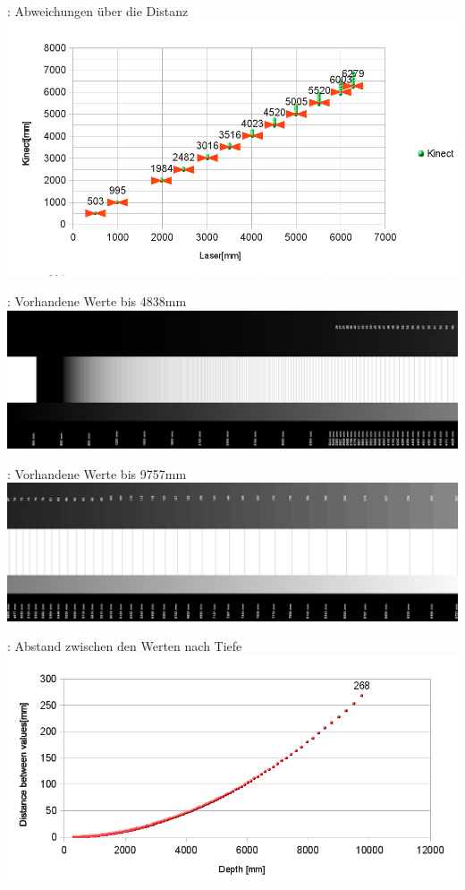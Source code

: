 \documentclass{VLKlauck}
\begin{document}
	\begin{frame}{\insertsubsection: Abweichungen über die Distanz}	
	\includegraphics[scale=0.6]{LaserDistanceKinectDistance.png}
    \end{frame}
    
    \begin{frame}{\insertsubsection: Vorhandene Werte bis 4838mm}
	\hbox{\includegraphics[scale=0.073]{availdepths0.png}}
	\end{frame}
	
	\begin{frame}{\insertsubsection: Vorhandene Werte bis 9757mm}	
	\hbox{\includegraphics[scale=0.073]{availdepths1.png}}
	\end{frame}
	
	\begin{frame}{\insertsubsection: Abstand zwischen den Werten nach Tiefe}	
	\includegraphics[width=\textwidth]{DifferenceForegoing.png}
	\end{frame}
	
\end{document}
